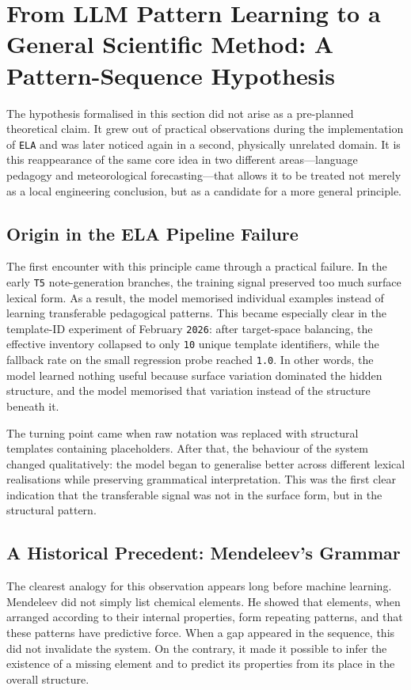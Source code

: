 \documentclass[12pt,a4paper,oneside]{report}
\begin{document}
\section{From LLM Pattern Learning to a General Scientific Method:
         A Pattern-Sequence Hypothesis}

The hypothesis formalised in this section did not arise as a pre-planned theoretical claim. It grew out of practical observations during the implementation of \texttt{ELA} and was later noticed again in a second, physically unrelated domain. It is this reappearance of the same core idea in two different areas---language pedagogy and meteorological forecasting---that allows it to be treated not merely as a local engineering conclusion, but as a candidate for a more general principle.

\subsection*{Origin in the ELA Pipeline Failure}

The first encounter with this principle came through a practical failure. In the early \texttt{T5} note-generation branches, the training signal preserved too much surface lexical form. As a result, the model memorised individual examples instead of learning transferable pedagogical patterns. This became especially clear in the template-ID experiment of February \texttt{2026}: after target-space balancing, the effective inventory collapsed to only \texttt{10} unique template identifiers, while the fallback rate on the small regression probe reached \texttt{1.0}. In other words, the model learned nothing useful because surface variation dominated the hidden structure, and the model memorised that variation instead of the structure beneath it.

The turning point came when raw notation was replaced with structural templates containing placeholders. After that, the behaviour of the system changed qualitatively: the model began to generalise better across different lexical realisations while preserving grammatical interpretation. This was the first clear indication that the transferable signal was not in the surface form, but in the structural pattern.

\subsection*{A Historical Precedent: Mendeleev's Grammar}

The clearest analogy for this observation appears long before machine learning. Mendeleev did not simply list chemical elements. He showed that elements, when arranged according to their internal properties, form repeating patterns, and that these patterns have predictive force. When a gap appeared in the sequence, this did not invalidate the system. On the contrary, it made it possible to infer the existence of a missing element and to predict its properties from its place in the overall structure.
\end{document}
